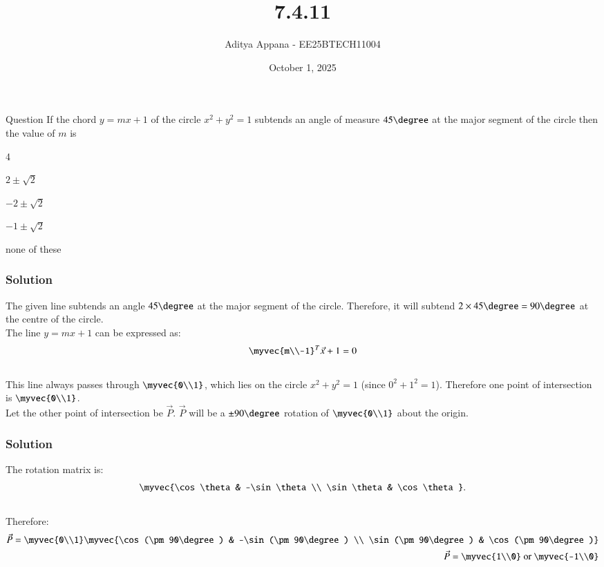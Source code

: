 \documentclass{beamer}
\title %
{7.4.11}
\date{October 1, 2025}
\author %
{Aditya Appana - EE25BTECH11004}
\begin{document}
\frame{\titlepage}
\begin{frame}{Question}
If the chord $y = mx + 1$ of the circle $x^2 + y^2 = 1$ subtends an angle of measure $45\degree$
at the major segment of the circle then the value of $m$ is
\begin{enumerate}
\begin{multicols}{4}
    \item $2 \pm \sqrt{2}$
    \item $-2 \pm \sqrt{2}$
    \item $-1 \pm \sqrt{2}$
    \item none of these
    
    \end{multicols}
\end{enumerate}\end{frame}



\begin{frame}[fragile]
    \frametitle{Solution}
The given line subtends an angle $45\degree$ at the major segment of the circle. Therefore, it will subtend $2\times 45\degree = 90\degree$ at the centre of the circle.\vspace{0.6cm}\\
The line $y = mx + 1$ can be expressed as:
\begin{align}
    \myvec{m\\-1}^T\vec{x} + 1 =0
\end{align}\\
This line always passes through $\myvec{0\\1}$, which lies on the circle $x^2 + y^2 = 1$ (since $0^2 + 1^2 = 1$). Therefore one point of intersection is $\myvec{0\\1}$.\vspace{0.6cm}\\
Let the other point of intersection be $\vec{P}$. $\vec{P}$ will be a $\pm90\degree$ rotation of $\myvec{0\\1}$ about the origin.
\end{frame}


\begin{frame}[fragile]
    \frametitle{Solution}
The rotation matrix is:
\begin{align}
\myvec{\cos\theta & -\sin\theta \\ \sin\theta & \cos\theta}.
\end{align}\\
Therefore:
\begin{align}
\vec{P}= \myvec{0\\1}\myvec{\cos(\pm 90\degree) & -\sin(\pm90\degree) \\ \sin(\pm90\degree) & \cos(\pm90\degree)}\\
\vec{P} = \myvec{1\\0} \text{ or } \myvec{-1\\0}
\end{align}
\end{frame}
\end{document}
